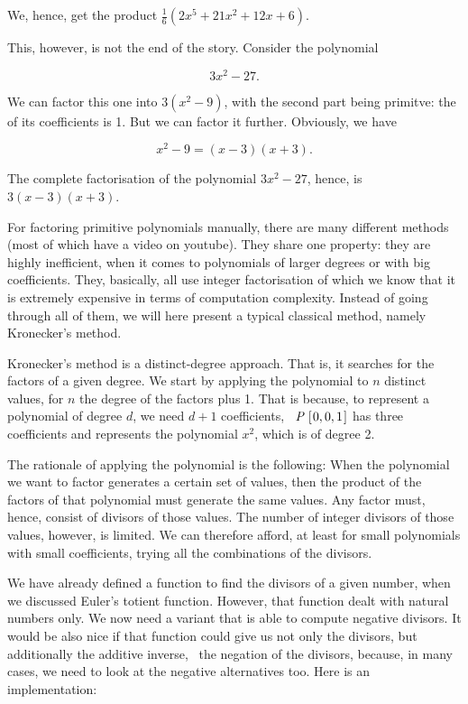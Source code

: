 \documentclass[tikz]{scrreprt}
\newcommand{\Conid}[1]{\mathit{#1}}
\begin{document}
We, hence, get the product
$\frac{1}{6}(2x^5 + 21x^2 + 12x + 6)$.

This, however, is not the end of the story.
Consider the polynomial 

\[
3x^2 - 27.
\]

We can factor this one into
$3(x^2 - 9)$, with the second part being
primitve: the  of its coefficients
is 1. But we can factor it further.
Obviously, we have

\begin{equation}
x^2 - 9 = (x - 3)(x + 3).
\end{equation}

The complete factorisation of the polynomial
$3x^2 - 27$, hence, is $3(x-3)(x+3)$.

For factoring primitive polynomials manually, there
are many different methods (most of which have a
video on youtube). They share one property:
they are highly inefficient, when it comes
to polynomials of larger degrees or with big
coefficients. They, basically, all use integer
factorisation of which we know that it is extremely
expensive in terms of computation complexity.
Instead of going through all of them, we will here
present a typical classical method, namely Kronecker's
method.

Kronecker's method is a distinct-degree approach. 
That is, it searches for the factors of a given degree.
We start by applying the polynomial to $n$ distinct values,
for $n$ the degree of the factors plus 1.
That is because, to represent a polynomial of degree $d$,
we need $d+1$ coefficients, \eg\ \ensuremath{\Conid{P}\;[\mskip1.5mu \mathrm{0},\mathrm{0},\mathrm{1}\mskip1.5mu]} has three
coefficients and represents the polynomial $x^2$, which is
of degree 2.

The rationale of applying the polynomial is the following:
When the polynomial we want to factor generates
a certain set of values, then the product of the factors
of that polynomial must generate the same values.
Any factor must, hence, consist of divisors of those values. 
The number of integer divisors
of those values, however, is limited.
We can therefore afford, at least for small polynomials
with small coefficients, trying all the combinations
of the divisors.

We have already defined a function
to find the divisors of a given number,
when we discussed Euler's totient function.
However, that function dealt with natural numbers
only. We now need a variant that is able to
compute negative divisors.
It would be also nice if that function
could give us not only the divisors,
but additionally the additive inverse,
\ie\ the negation of the divisors, because,
in many cases, we need to look at the negative
alternatives too. Here is an implementation:
\end{document}
